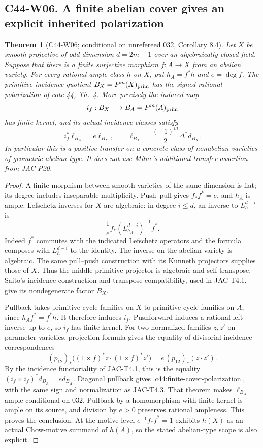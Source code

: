 \documentclass[11pt]{article}
\newtheorem{theorem}{Theorem}[section]
\theoremstyle{remark}\newtheorem{remark}[theorem]{Remark}
\begin{document}
\subsection*{C44-W06. A finite abelian cover gives an explicit inherited polarization}

\begin{theorem}[C44-W06; conditional on unrefereed 032, Corollary 8.4]
Let $X$ be smooth projective of odd dimension $d=2m-1$ over an
algebraically closed field. Suppose that there is a finite surjective
morphism $f:A\to X$ from an abelian variety. For every rational ample
class $h$ on $X$, put $h_A=f^*h$ and $e=\deg f$. The primitive
incidence quotient $B_X=P^m(X)_{\rm prim}$ has the signed rational
polarization of cote 44, Th.~4. More precisely the induced map
\[
 i_f:B_X\longrightarrow B_A=P^m(A)_{\rm prim}
\]
has finite kernel, and its actual incidence classes satisfy
\begin{equation}\label{c44:finite-cover-polarization}
 i_f^*\ell_{B_A}=e\ell_{B_X},\qquad
 \ell_{B_X}=\frac{(-1)^m}{2}\Delta^*d_{B_X}.
\end{equation}
In particular this is a positive transfer on a concrete class of
nonabelian varieties of geometric abelian type. It does not use
Milne's additional transfer assertion from JAC-P20.
\end{theorem}

\begin{proof}
A finite morphism between smooth varieties of the same dimension is
flat; its degree includes inseparable multiplicity. Push--pull gives
$f_*f^*=e$, and $h_A$ is ample. Lefschetz inverses for $X$ are
algebraic: in degree $i\leq d$, an inverse to $L_h^{d-i}$ is
\[
 \frac1e f_* (L_{h_A}^{d-i})^{-1}f^*.
\]
Indeed $f^*$ commutes with the indicated Lefschetz operators and
the formula composes with $L_h^{d-i}$ to the identity. The inverse
on the abelian variety is algebraic. The same pull--push construction
with its Kunneth projectors supplies those of $X$. Thus the middle
primitive projector is algebraic and self-transpose. Saito's
incidence construction and transpose compatibility, used in
JAC-T4.1, give its nondegenerate factor $B_X$.

Pullback takes primitive cycle families on $X$ to primitive cycle
families on $A$, since $h_Af^*=f^*h$. It therefore induces $i_f$.
Pushforward induces a rational left inverse up to $e$, so $i_f$ has
finite kernel. For two normalized families $z,z'$ on parameter
varieties, projection formula gives the equality of divisorial
incidence correspondences
\[
 (p_{12})_*\bigl((1\times f)^*z\cdot(1\times f)^*z'\bigr)
   =e\,(p_{12})_*(z\cdot z').
\]
By the incidence functoriality of JAC-T4.1, this is the equality
$(i_f\times i_f)^*d_{B_A}=e d_{B_X}$. Diagonal pullback gives
\eqref{c44:finite-cover-polarization}, with the same sign and
normalization as JAC-T4.3. That theorem makes $\ell_{B_A}$ ample
conditional on 032. Pullback by a homomorphism with finite kernel
is ample on its source, and division by $e>0$ preserves rational
ampleness. This proves the conclusion. At the motive level
$e^{-1}f_*f^*=1$ exhibits $h(X)$ as an actual Chow-motive summand
of $h(A)$, so the stated abelian-type scope is also explicit.
\end{proof}
\end{document}
